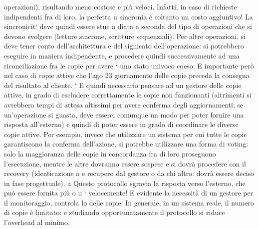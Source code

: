 operazioni), risultando meno costose
e più veloci. Infatti, in caso di richieste indipendenti fra di loro, la perfetta
u
sincronia è soltanto un costo aggiuntivo! La sincronicit` deve quindi essere stue
a
diata a seconda del tipo di operazioni che si devono svolgere (letture sincrone,
scritture sequenziali). Per altre operazioni, si deve tener conto dell'architettura
e del signicato dell'operazione: si potrebbero eseguire in maniera indipendente,
e procedere quindi successivamente ad una riconciliazione fra le copie per avere
`
uno stato univoco coeso. E importante però nel caso di copie attive che l'ago
23
giornamento delle copie preceda la consegna del risultato al cliente.
`
E quindi necessario pensare ad un gestore delle copie attive, in grado di escludere correttamente le copie non
funzionanti (altrimenti si avrebbero tempi
di attesa altissimi per avere conferma degli aggiornamenti; se un'operazione si
guasta, deve esserci comunque un modo per poter fornire una risposta all'esterno) e quindi di poter essere in grado di
coordinare le diverse copie attive. Per
esempio, invece che utilizzare un sistema per cui tutte le copie garantiscono la
conferma dell'azione, si potrebbe utilizzare una forma di voting: solo la maggioranza delle copie in concordanza fra di
loro proseguono l'esecuzione, mentre le
altre dovranno essere sospese e si dovrà procedere con il recovery (identicazione
a
e recupero dal gestore o da chi altro: dovrà essere deciso in fase progettuale).
a
Questo protocollo sgravia la risposta verso l'esterno, che può essere fornita più
o
u
`
velocemente! E evidente la necessità di un gestore per il monitoraggio, controla
lo delle copie. In generale, in un sistema reale, il numero di copie è limitato:
e
studiando opportunatamente il protocollo si riduce l'overhead al minimo.
